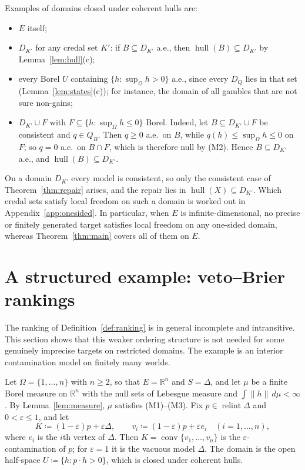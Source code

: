 \documentclass[11pt]{article}
\newcommand{\R}{\mathbb{R}}
\newcommand{\hull}{\operatorname{hull}}
\DeclareMathOperator{\conv}{conv}
\DeclareMathOperator{\relint}{relint}
\theoremstyle{plain}
\theoremstyle{definition}
\theoremstyle{remark}
\begin{document}
Examples of domains closed under coherent hulls are:
\begin{itemize}
  \item $E$ itself;
  \item $D_{K'}$ for any credal set $K'$: if $B\subseteq D_{K'}$ a.e., then $\hull(B)\subseteq
  D_{K'}$ by Lemma~\ref{lem:hull}(c);
  \item every Borel $U$ containing $\{h:\sup_\Omega h>0\}$ a.e., since every $D_Q$ lies in that
  set (Lemma~\ref{lem:states}(c)); for instance, the domain of all gambles that are not sure
  non-gains;
  \item $D_{K'}\cup F$ with $F\subseteq\{h:\sup_\Omega h\le0\}$ Borel. Indeed, let $B\subseteq
  D_{K'}\cup F$ be consistent and $q\in Q_B$. Then $q\ge0$ a.e.\ on $B$, while $q(h)\le
  \sup_\Omega h\le0$ on $F$; so $q=0$ a.e.\ on $B\cap F$, which is therefore null by (M2). Hence
  $B\subseteq D_{K'}$ a.e., and $\hull(B)\subseteq D_{K'}$.
\end{itemize}
On a domain $D_{K'}$ every model is consistent, so only the consistent case of
Theorem~\ref{thm:repair} arises, and the repair lies in $\hull(X)\subseteq D_{K'}$. Which credal
sets satisfy local freedom on such a domain is worked out in Appendix~\ref{app:onesided}. In
particular, when $E$ is infinite-dimensional, no precise or finitely generated target satisfies
local freedom on any one-sided domain, whereas Theorem~\ref{thm:main} covers all of them on $E$.

\section{A structured example: veto--Brier rankings}\label{sec:vb}

The ranking of Definition~\ref{def:ranking} is in general incomplete and intransitive. This
section shows that this weaker ordering structure is not needed for some genuinely imprecise
targets on restricted domains. The example is an interior contamination model on finitely many
worlds.

Let $\Omega=\{1,\dots,n\}$ with $n\ge2$, so that $E=\R^n$ and $S=\Delta$, and let $\mu$ be a
finite Borel measure on $\R^n$ with the null sets of Lebesgue measure and $\int\|h\|\,d\mu<
\infty$. By Lemma~\ref{lem:measure}, $\mu$ satisfies (M1)--(M3). Fix $p\in\relint\Delta$ and
$0<\varepsilon\le1$, and let
\[
  K\coloneqq(1-\varepsilon)p+\varepsilon\Delta,\qquad v_i\coloneqq(1-\varepsilon)p+
  \varepsilon e_i\quad(i=1,\dots,n),
\]
where $e_i$ is the $i$th vertex of $\Delta$. Then $K=\conv\{v_1,\dots,v_n\}$ is the
$\varepsilon$-contamination of $p$; for $\varepsilon=1$ it is the vacuous model $\Delta$. The
domain is the open half-space $U\coloneqq\{h:p\cdot h>0\}$, which is closed under coherent
hulls.
\end{document}
